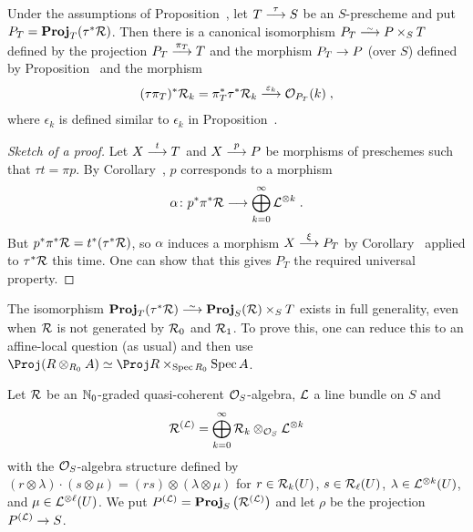 \documentclass[a4paper,parskip=half,numbers=enddot, DIV=12]{scrreprt}
\begin{document}
\begin{cor}
	Under the assumptions of Proposition~, let $T\morphism[\tau]S$ be an $S$-prescheme and put $P_T=\operatorname{\mathbf{Proj}}_T(\tau^*\mathcal{R})$. Then there is a canonical isomorphism $P_T\isomorphism P\times_ST$ defined by the projection $P_T\morphism[\pi_T]T$ and the morphism $P_T\morphism P$ (over $S$) defined by Proposition~ and the morphism
	\begin{align*}
		(\tau\pi_T)^*\Rr_k= \pi_T^*\tau^*\Rr_k\morphism[\epsilon_k]\Oo_{P_T}(k)\;,
	\end{align*}
	where $\epsilon_k$ is defined similar to $\epsilon_k$ in Proposition~.
\end{cor}
\begin{proof}[Sketch of a proof]
	Let $X\morphism[t]T$ and $X\morphism[p]P$ be morphisms of preschemes such that $\tau t=\pi p$. By Corollary~, $p$ corresponds to a morphism
	\begin{align*}
		\alpha\colon p^*\pi^*\Rr\morphism\bigoplus_{k=0}^\infty\Ll^{\otimes k}\;.
	\end{align*}
	But $p^*\pi^*\mathcal{R}=t^*(\tau^*\mathcal{R})$, so $\alpha$ induces a morphism $X\morphism[\xi]P_T$ by Corollary~ applied to $\tau^*\mathcal{R}$ this time. One can show that this gives $P_T$ the required universal property.
\end{proof}
\begin{rem}
	The isomorphism $\PROJ_T(\tau^*\Rr)\isomorphism\PROJ_S(\Rr)\times_ST$ exists in full generality, even when $\mathcal{R}$ is not generated by $\mathcal{R}_0$ and $\mathcal{R}_1$. To prove this, one can reduce this to an affine-local question (as usual) and then use $\Proj (R\otimes_{R_0}A)\simeq \Proj R\times_{\Spec R_0}\Spec A$.
\end{rem}
Let $\mathcal{R}$ be an $\mathbb{N}_0$-graded quasi-coherent $\mathcal{O}_S$-algebra, $\mathcal{L}$ a line bundle on $S$ and
\begin{align*}
	\mathcal{R}^{(\mathcal{L})}=\bigoplus_{k=0}^\infty\mathcal{R}_k\otimes_{\mathcal{O}_S} \mathcal{L}^{\otimes k}
\end{align*}
with the $\mathcal{O}_S$-algebra structure defined by $(r\otimes \lambda)\cdot (s\otimes \mu)=(rs)\otimes (\lambda\otimes\mu)$ for $r\in\mathcal{R}_k(U)$, $s\in\mathcal{R}_{\ell}(U)$, $\lambda\in\mathcal{L}^{\otimes k}(U)$, and $\mu\in\mathcal{L}^{\otimes \ell}(U)$. We put $P^{(\mathcal{L})}=\operatorname{\mathbf{Proj}}_S\big(\mathcal{R}^{(\mathcal{L})}\big)$ and let $\rho$ be the projection $P^{(\Ll)}\morphism S$.
\end{document}

